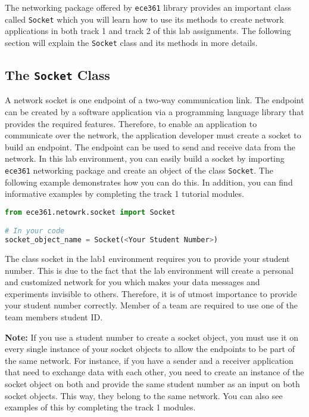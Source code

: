 \documentclass[11pt]{article}
\begin{document}
The networking package offered by \texttt{ece361} library provides an important class called \texttt{Socket} which you will learn how to use its methods to create network applications in both track 1 and track 2 of this lab assignments. The following section will explain the \texttt{Socket} class and its methods in more details.

\subsection{The \texttt{Socket} Class}
\label{subsec:socket-class}
A network socket is one endpoint of a two-way communication link. The endpoint can be created by a software application via a programming language library that provides the required features.
Therefore, to enable an application to communicate over the network, the application developer must create a socket to build an endpoint.
The endpoint can be used to send and receive data from the network. In this lab environment, you can easily build a socket by importing \texttt{ece361} networking package and create an object of the class \texttt{Socket}.
The following example demonstrates how you can do this. In addition, you can find informative examples by completing the track 1 tutorial modules.

\begin{lstlisting}[caption={Importing the \texttt{Socket} class}, language=Python]
from ece361.netowrk.socket import Socket

# In your code
socket_object_name = Socket(<Your Student Number>)
\end{lstlisting}

The class socket in the lab1 environment requires you to provide your student number. This is due to the fact that the lab environment will create a personal and customized network for you which makes your data messages and experiments invisible to others. Therefore, it is of utmost importance to provide your student number correctly. Member of a team are required to use one of the team members student ID.

\textbf{Note:}
If you use a student number to create a socket object, you must use it on every single instance of your socket objects to allow the endpoints to be part of the same network. For instance, if you have a sender and a receiver application that need to exchange data with each other, you need to create an instance of the socket object on both and provide the same student number as an input on both socket objects. This way, they belong to the same network. You can also see examples of this by completing the track 1 modules.
\end{document}
